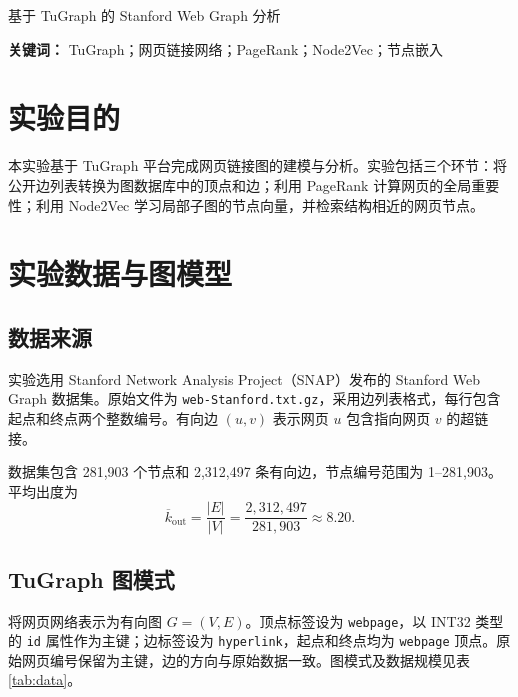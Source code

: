 \documentclass[UTF8,a4paper,12pt,fontset=windows]{ctexart}
\begin{document}
\restoregeometry
{}
\begin{center}
{\heiti 基于 TuGraph 的 Stanford Web Graph 分析}
\end{center}
\vspace{1em}
\begin{abstract}
\normalsize
本文以 Stanford Web Graph 为实验数据，在 TuGraph 中构建网页链接图，并开展 PageRank 节点排序和 Node2Vec 节点嵌入实验。数据集包含 281,903 个网页节点和 2,312,497 条有向链接。通过 CSV 批量导入与 Cypher 查询完成图数据建模和规模核验，再基于 TuGraph 导出的边表运行图算法。PageRank 在全图上迭代 100 轮，节点 89073 的得分最高，为 0.01130285。Node2Vec 在以该节点为中心的 1,200 节点子图上学习 32 维向量，训练损失由 2.01132 降至 1.85049，并通过余弦相似度获得结构近邻。通过阻尼系数对比、分值集中度统计和嵌入可视化，进一步分析了网页网络的全局结构与局部关系。
\end{abstract}
\noindent\textbf{关键词：} TuGraph；网页链接网络；PageRank；Node2Vec；节点嵌入
\clearpage
\tableofcontents
\clearpage
{}

\section{实验目的}
本实验基于 TuGraph 平台完成网页链接图的建模与分析。实验包括三个环节：将公开边列表转换为图数据库中的顶点和边；利用 PageRank 计算网页的全局重要性；利用 Node2Vec 学习局部子图的节点向量，并检索结构相近的网页节点。

\section{实验数据与图模型}
\subsection{数据来源}
实验选用 Stanford Network Analysis Project（SNAP）发布的 Stanford Web Graph 数据集\cite{snap}。原始文件为 \texttt{web-Stanford.txt.gz}，采用边列表格式，每行包含起点和终点两个整数编号。有向边 $(u,v)$ 表示网页 $u$ 包含指向网页 $v$ 的超链接。

数据集包含 281,903 个节点和 2,312,497 条有向边，节点编号范围为 1--281,903。平均出度为
\begin{equation}
\overline{k}_{\mathrm{out}}=\frac{|E|}{|V|}=\frac{2{,}312{,}497}{281{,}903}\approx 8.20.
\end{equation}

\subsection{TuGraph 图模式}
将网页网络表示为有向图 $G=(V,E)$。顶点标签设为 \texttt{webpage}，以 INT32 类型的 \texttt{id} 属性作为主键；边标签设为 \texttt{hyperlink}，起点和终点均为 \texttt{webpage} 顶点。原始网页编号保留为主键，边的方向与原始数据一致。图模式及数据规模见表\ref{tab:data}。
\end{document}
